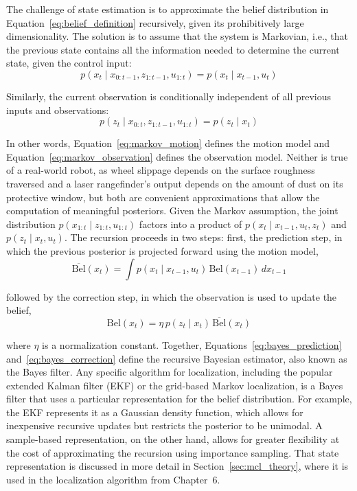 The challenge of state estimation is to approximate the belief distribution in Equation~\eqref{eq:belief_definition} recursively, given its prohibitively large dimensionality. The solution is to assume that the system is Markovian, i.e., that the previous state contains all the information needed to determine the current state, given the control input:
\begin{equation}
p(x_t \mid x_{0:t-1}, z_{1:t-1}, u_{1:t}) = p(x_t \mid x_{t-1}, u_t) \label{eq:markov_motion}
\end{equation}

Similarly, the current observation is conditionally independent of all previous inputs and observations:
\begin{equation}
p(z_t \mid x_{0:t}, z_{1:t-1}, u_{1:t}) = p(z_t \mid x_t) \label{eq:markov_observation}
\end{equation}

In other words, Equation~\eqref{eq:markov_motion} defines the motion model and Equation~\eqref{eq:markov_observation} defines the observation model. Neither is true of a real-world robot, as wheel slippage depends on the surface roughness traversed and a laser rangefinder's output depends on the amount of dust on its protective window, but both are convenient approximations that allow the computation of meaningful posteriors. Given the Markov assumption, the joint distribution $p(x_{1:t} \mid z_{1:t}, u_{1:t})$ factors into a product of $p(x_t \mid x_{t-1}, u_t, z_t)$ and $p(z_t \mid x_t, u_t)$. The recursion proceeds in two steps: first, the prediction step, in which the previous posterior is projected forward using the motion model,
\begin{equation}
\overline{\mathrm{Bel}}(x_t) = \int p(x_t \mid x_{t-1}, u_t)\, \mathrm{Bel}(x_{t-1}) \, dx_{t-1} \label{eq:bayes_prediction}
\end{equation}

followed by the correction step, in which the observation is used to update the belief,
\begin{equation}
\mathrm{Bel}(x_t) = \eta \, p(z_t \mid x_t) \, \overline{\mathrm{Bel}}(x_t) \label{eq:bayes_correction}
\end{equation}

where $\eta$ is a normalization constant. Together, Equations~\eqref{eq:bayes_prediction} and~\eqref{eq:bayes_correction} define the recursive Bayesian estimator, also known as the Bayes filter. Any specific algorithm for localization, including the popular extended Kalman filter (EKF) or the grid-based Markov localization, is a Bayes filter that uses a particular representation for the belief distribution. For example, the EKF represents it as a Gaussian density function, which allows for inexpensive recursive updates but restricts the posterior to be unimodal. A sample-based representation, on the other hand, allows for greater flexibility at the cost of approximating the recursion using importance sampling. That state representation is discussed in more detail in Section~\ref{sec:mcl_theory}, where it is used in the localization algorithm from Chapter~6.

